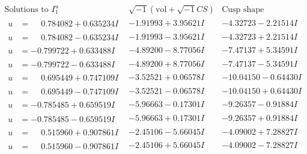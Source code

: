 \documentclass[1p]{elsarticle_modified}
\theoremstyle{definition}
\newcommand{\I}{\sqrt{-1}}
\begin{document}
$$\begin{array}{c|c|c}  
\text{Solutions to }I^u_{1}& \I (\text{vol} + \sqrt{-1}CS) & \text{Cusp shape}\\
 \hline 
\begin{aligned}
u &= \phantom{-}0.784082 + 0.635234 I\end{aligned}
 & -1.91993 + 3.95621 I & -4.32723 - 2.21514 I \\ \hline\begin{aligned}
u &= \phantom{-}0.784082 - 0.635234 I\end{aligned}
 & -1.91993 - 3.95621 I & -4.32723 + 2.21514 I \\ \hline\begin{aligned}
u &= -0.799722 + 0.633488 I\end{aligned}
 & -4.89200 - 8.77056 I & -7.47137 + 5.34591 I \\ \hline\begin{aligned}
u &= -0.799722 - 0.633488 I\end{aligned}
 & -4.89200 + 8.77056 I & -7.47137 - 5.34591 I \\ \hline\begin{aligned}
u &= \phantom{-}0.695449 + 0.747109 I\end{aligned}
 & -3.52521 + 0.06578 I & -10.04150 - 0.64430 I \\ \hline\begin{aligned}
u &= \phantom{-}0.695449 - 0.747109 I\end{aligned}
 & -3.52521 - 0.06578 I & -10.04150 + 0.64430 I \\ \hline\begin{aligned}
u &= -0.785485 + 0.659519 I\end{aligned}
 & -5.96663 - 0.17301 I & -9.26357 - 0.91884 I \\ \hline\begin{aligned}
u &= -0.785485 - 0.659519 I\end{aligned}
 & -5.96663 + 0.17301 I & -9.26357 + 0.91884 I \\ \hline\begin{aligned}
u &= \phantom{-}0.515960 + 0.907861 I\end{aligned}
 & -2.45106 - 5.66045 I & -4.09002 + 7.28827 I \\ \hline\begin{aligned}
u &= \phantom{-}0.515960 - 0.907861 I\end{aligned}
 & -2.45106 + 5.66045 I & -4.09002 - 7.28827 I \\ \hline\begin{aligned}

\end{aligned}
\end{array}$$
\end{document}
